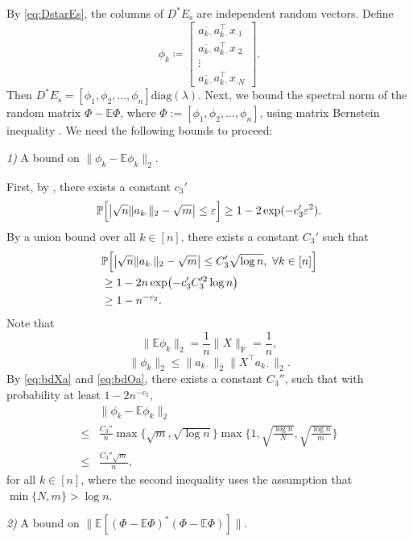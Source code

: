 \documentclass[11pt,journal]{IEEEtran}
\newcommand{\bbE}{\mathbb{E}}
\newcommand{\bbP}{\mathbb{P}}
\newcommand{\rmF}{\mathrm{F}}
\newcommand{\rms}{\mathrm{s}}
\newcommand{\norm}[1]{\|{#1}\|}
\newcommand{\T}{\top}
\newcommand{\diag}{\mathrm{diag}}
\begin{document}
\begin{IEEEproof}
By \eqref{eq:DstarEs}, the columns of $D^*E_\rms$ are independent random vectors. Define
\[
\phi_k \coloneqq \begin{bmatrix}
\overline{a_{k\cdot}}a_{k\cdot}^\T x_{\cdot 1} \\
\overline{a_{k\cdot}}a_{k\cdot}^\T x_{\cdot 2} \\
\vdots \\
\overline{a_{k\cdot}}a_{k\cdot}^\T x_{\cdot N}
\end{bmatrix}.
\]
Then $D^*E_\rms = [\phi_1,\phi_2,\dots, \phi_n]\diag(\lambda)$. Next, we bound the spectral norm of the random matrix $\Phi-\bbE \Phi$, where $\Phi := [\phi_1,\phi_2,\dots, \phi_n]$, using matrix Bernstein inequality \cite[Theorem 1.6]{Tropp2011}. We need the following bounds to proceed:

\emph{1)} A bound on $\norm{\phi_k-\bbE \phi_k}_2$.

First, by \cite[Theorem 2.1 and Section 3.1]{Rudelson2013}, there exists a constant $c_3'$
\[
\bbP\Bigl[ \bigl|\sqrt{n}\norm{a_{k\cdot}}_2 - \sqrt{m}\bigr| \leq \varepsilon \Bigr] \geq 1-2\exp(-c_3'\varepsilon^2).
\]
By a union bound over all $k\in[n]$, there exists a constant $C_3'$ such that
\begin{align}
\nonumber & \bbP\Bigl[ \bigl|\sqrt{n}\norm{a_{k\cdot}}_2 - \sqrt{m}\bigr| \leq C_3'\sqrt{\log n},~  \forall k\in[n] \Bigr] \\
\nonumber & \geq 1-2 n\exp\bigl(-c_3'C_3'^2 \log n\bigr) \\
\label{eq:bdOa} & \geq 1-n^{-c_2}.
\end{align}
Note that
\[
\norm{\bbE \phi_k}_2 = \frac{1}{n} \norm{X}_\rmF = \frac{1}{n},
\]
\[
\norm{\phi_k}_2 \leq \norm{a_{k\cdot}}_2 \norm{X^\T a_{k\cdot}}_2.
\]
By \eqref{eq:bdXa} and \eqref{eq:bdOa}, there exists a constant $C_3''$, such that with probability at least $1-2n^{-c_2}$,
\begin{align*}
& \norm{\phi_k-\bbE \phi_k}_2 \\
\leq & \frac{C_3''}{n} \max\Big\{\sqrt{m},\sqrt{\log n}\Big\} \max\Big\{1,\sqrt{\frac{\log n}{N}},\sqrt{\frac{\log n}{m}}\Big\} \\
\leq & \frac{C_3''\sqrt{m}}{n} ,
\end{align*}
for all $k\in[n]$, where the second inequality uses the assumption that $\min\{N,m\}>\log n$.

\emph{2)} A bound on $\norm{\bbE [(\Phi-\bbE \Phi)^*(\Phi-\bbE \Phi)]}$.


\end{IEEEproof}
\end{document}
